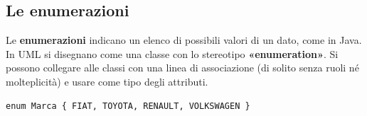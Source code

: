 \subsection{Le enumerazioni}

\noindent\begin{minipage}[c]{0.55\textwidth}
Le \textbf{enumerazioni} indicano un elenco di possibili valori di un dato, come in Java. In UML si disegnano come una classe con
lo stereotipo \textbf{«enumeration»}. Si possono collegare alle classi con una linea di associazione (di solito senza ruoli né
molteplicità) e usare come tipo degli attributi.
\end{minipage}\hfill
\begin{minipage}[c]{0.4\textwidth}
\centering
{}
\begin{lstlisting}[style=java]
enum Marca { FIAT, TOYOTA, RENAULT, VOLKSWAGEN }
\end{lstlisting}
\end{minipage}


